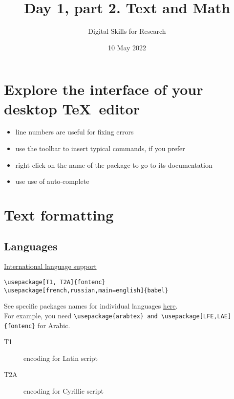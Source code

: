 \documentclass[a4paper,11pt,leqno]{article}
\title{Day 1, part 2. Text and Math}
\author{Digital Skills for Research}
\date{10 May 2022}
\begin{document}
\maketitle
\tableofcontents

\section{Explore the interface of your desktop \TeX~editor}

\begin{itemize}
	\item line numbers are useful for fixing errors
	\item use the toolbar to insert typical commands, if you prefer
	\item right-click on the name of the package to go to its documentation
	\item use use of auto-complete
\end{itemize}

\section{Text formatting}


\subsection{Languages}

 \href{https://www.overleaf.com/learn/latex/International_language_support}{International language support}

\begin{lstlisting}[breaklines]
\usepackage[T1, T2A]{fontenc}
\usepackage[french,russian,main=english]{babel}
\end{lstlisting}

See specific packages names for individual languages \href{https://github.com/kunilovskaya/malaga_dskills/tree/master/alphabets}{here}. \\ For example, you need \verb|\usepackage{arabtex} and \usepackage[LFE,LAE]{fontenc}| for Arabic.

\begin{description}
	\item[T1] encoding for Latin script
	\item[T2A] encoding for Cyrillic script
\end{description}
\end{document}
